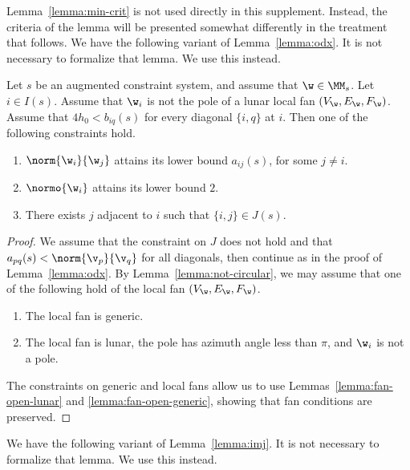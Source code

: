 Lemma~\ref{lemma:min-crit} is not used directly in this supplement.
Instead, the criteria of the lemma will be presented somewhat differently
in the treatment that follows.
We have the following variant of Lemma~\ref{lemma:odx}.
It is not necessary to formalize that lemma.  We use this instead.

\begin{lemma}\label{lemma:odx2} 
Let $s$ be an augmented constraint system,
and assume that $\w\in \MM_s$.  Let $i\in I(s)$.
Assume  that $\w_i$ is not the pole of a lunar local fan $(V_\w,E_\w,F_\w)$.
Assume that $4h_0 < b_{iq}(s)$ for every diagonal $\{i,q\}$ at $i$.
Then one of the following   constraints hold.
\begin{enumerate}
\item $\norm{\w_i}{\w_j}$ attains its lower bound $a_{i j}(s)$, for
  some $j\ne i$.
\item $\normo{\w_i}$ attains its lower bound $2$.
\item There exists $j$ adjacent to $i$ such that $\{i,j\}\in J(s)$.
\end{enumerate}
\end{lemma}

\begin{proof} 
We assume that the constraint on $J$ does not hold and
that $a_{p q}(s)<\norm{\v_p}{\v_q}$ for all diagonals, then continue as in the proof of
Lemma~\ref{lemma:odx}.  
By Lemma~\ref{lemma:not-circular}, we may assume  
that one of the following hold of the local fan $(V_\w,E_\w,F_\w)$.
\begin{enumerate}
\item The local fan is generic.
\item The local fan is lunar, the pole has azimuth
angle less than $\pi$, and $\w_i$ is not a pole.  
\end{enumerate}
The constraints on generic and local fans
allow us to use Lemmas~\ref{lemma:fan-open-lunar} and
\ref{lemma:fan-open-generic}, showing that fan conditions are preserved.
\end{proof}





We have the following variant of Lemma~\ref{lemma:imj}.
It is not necessary to formalize that lemma.  We use this instead.

